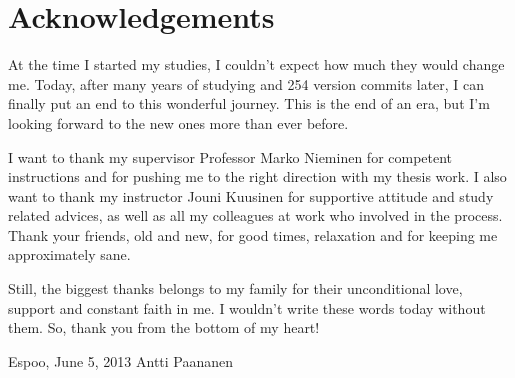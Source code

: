 \documentclass[12pt,a4paper,oneside,pdftex]{report}
\newcommand{\DATE}{June 5, 2013}
\newcommand{\AUTHOR}{Antti Paananen}
\begin{document}




\chapter*{Acknowledgements}

At the time I started my studies, I couldn't expect how much they would change me.
Today, after many years of studying and 254 version commits later, I can finally put an end to this wonderful journey.
This is the end of an era, but I'm looking forward to the new ones more than ever before.

I want to thank my supervisor Professor Marko Nieminen for competent instructions and for pushing me to the right direction with my thesis work. 
I also want to thank my instructor Jouni Kuusinen for supportive attitude and study related advices, as well as all my colleagues at work who involved in the process.
Thank your friends, old and new, for good times, relaxation and for keeping me approximately sane.

Still, the biggest thanks belongs to my family for their unconditional love, support and constant faith in me. I wouldn't write these words today without them.
So, thank you from the bottom of my heart! 

\vskip 10mm

\noindent Espoo, \DATE
\vskip 5mm
\noindent\AUTHOR

\cleardoublepage
% 
\end{document}
